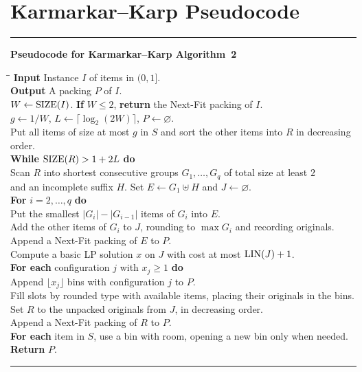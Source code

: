 \section{Karmarkar--Karp Pseudocode}
\label{app:karmarkar-karp}

\medskip
\noindent\begin{minipage}{\linewidth}
\hrule\smallskip
\textbf{Pseudocode for Karmarkar--Karp Algorithm~2}\par
\small
\begin{tabbing}
\hspace{1.3em}\=\hspace{1.3em}\=\hspace{1.3em}\=\kill
\textbf{Input} \quad Instance $I$ of items in $(0,1]$.\\
\textbf{Output} \quad A packing $P$ of $I$.\\
$W\gets\operatorname{SIZE}(I)$. \textbf{If} $W\le2$, \textbf{return} the Next-Fit packing of $I$.\\
$g\gets 1/W$, $L\gets\lceil\log_2(2W)\rceil$, $P\gets\varnothing$.\\
Put all items of size at most $g$ in $S$ and sort the other items into $R$ in decreasing order.\\
\textbf{While} $\operatorname{SIZE}(R)>1+2L$ \textbf{do}\\
\> Scan $R$ into shortest consecutive groups $G_1,\ldots,G_q$ of total size at least $2$\\
\> and an incomplete suffix $H$. Set $E\gets G_1\uplus H$ and $J\gets\varnothing$.\\
\> \textbf{For} $i=2,\ldots,q$ \textbf{do}\\
\>\> Put the smallest $|G_i|-|G_{i-1}|$ items of $G_i$ into $E$.\\
\>\> Add the other items of $G_i$ to $J$, rounding to $\max G_i$ and recording originals.\\
\> Append a Next-Fit packing of $E$ to $P$.\\
\> Compute a basic LP solution $x$ on $J$ with cost at most $\operatorname{LIN}(J)+1$.\\
\> \textbf{For each} configuration $j$ with $x_j\ge1$ \textbf{do}\\
\>\> Append $\lfloor x_j\rfloor$ bins with configuration $j$ to $P$.\\
\>\> Fill slots by rounded type with available items, placing their originals in the bins.\\
\> Set $R$ to the unpacked originals from $J$, in decreasing order.\\
Append a Next-Fit packing of $R$ to $P$.\\
\textbf{For each} item in $S$, use a bin with room, opening a new bin only when needed.\\
\textbf{Return} $P$.
\end{tabbing}
\smallskip\hrule
\end{minipage}
\par\medskip
